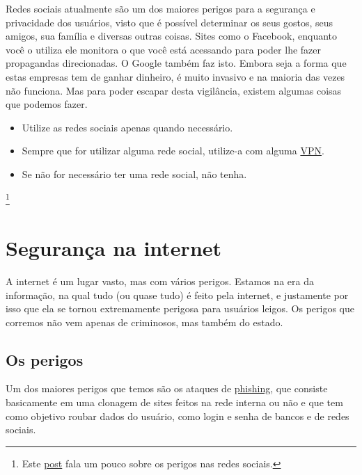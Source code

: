 \documentclass[12pt, letterpaper]{report}
\begin{document}
	Redes sociais atualmente são um dos maiores perigos para a segurança e privacidade dos usuários, visto que é possível determinar os seus gostos, seus amigos, sua família e diversas outras coisas. Sites como o Facebook, enquanto você o utiliza ele monitora o que você está acessando para poder lhe fazer propagandas direcionadas. O Google também faz isto. Embora seja a forma que estas empresas tem de ganhar dinheiro, é muito invasivo e na maioria das vezes não funciona. Mas para poder escapar desta vigilância, existem algumas coisas que podemos fazer.\\
	\begin{itemize} %
		\item Utilize as redes sociais apenas quando necessário.
		\item Sempre que for utilizar alguma rede social, utilize-a com alguma \href{https://criptowiki.miraheze.org/wiki/VPN_(Virtual_Private_Network)}{VPN}.
		\item Se não for necessário ter uma rede social, não tenha.
	\end{itemize} %

 \footnote{Este \href{https://www.linkedin.com/pulse/você-está-cuidando-da-sua-privacidade-na-internet-bruno-bustamante}{post} fala um pouco sobre os perigos nas redes sociais.}

\pagebreak %

\section*{Segurança na internet}
	A internet é um lugar vasto, mas com vários perigos. Estamos na era da informação, na qual tudo (ou quase tudo) é feito pela internet, e justamente por isso que ela se tornou extremamente perigosa para usuários leigos. Os perigos que corremos não vem apenas de criminosos, mas também do estado.\\

\subsection{Os perigos}

	Um dos maiores perigos que temos são os ataques de \href{https://criptowiki.miraheze.org/wiki/Phishing}{phishing}, que consiste basicamente em uma clonagem de sites feitos na rede interna ou não e que tem como objetivo roubar dados do usuário, como login e senha de bancos e de redes sociais.\\
\end{document}
